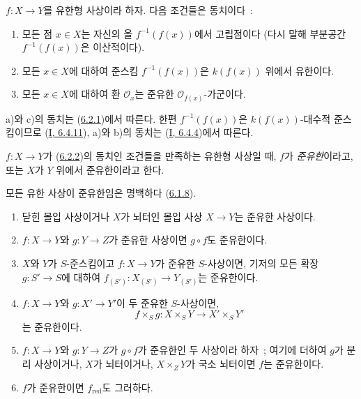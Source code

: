 \begin{corollary}[6.2.2]
\label{II.6.2.2-ko}
$f:X\to Y$를 유한형 사상이라 하자. 다음 조건들은 동치이다~:
\begin{enumerate}
\item[a)] 모든 점 $x\in X$는 자신의 올 $f^{-1}(f(x))$에서 고립점이다
(다시 말해 부분공간 $f^{-1}(f(x))$은 이산적이다).
\item[b)] 모든 $x\in X$에 대하여 준스킴 $f^{-1}(f(x))$은
$k(f(x))$ 위에서 유한이다.
\item[c)] 모든 $x\in X$에 대하여 환 $\mathcal{O}_x$는 준유한
$\mathcal{O}_{f(x)}$-가군이다.
\end{enumerate}
\end{corollary}

a)와 c)의 동치는 (\hyperref[II.6.2.1-ko]{6.2.1})에서 따른다. 한편
$f^{-1}(f(x))$은 $k(f(x))$-대수적 준스킴이므로
(\hyperref[I.6.4.11-ko]{I, 6.4.11}), a)와 b)의 동치는
(\hyperref[I.6.4.4-ko]{I, 6.4.4})에서 따른다.

\begin{definition}[6.2.3]
\label{II.6.2.3-ko}
$f:X\to Y$가 (\hyperref[II.6.2.2-ko]{6.2.2})의 동치인 조건들을
만족하는 유한형 사상일 때, $f$가 \emph{준유한}이라고, 또는 $X$가
$Y$ 위에서 준유한이라고 한다.
\end{definition}

모든 유한 사상이 준유한임은 명백하다
(\hyperref[II.6.1.8-ko]{6.1.8}).

\begin{proposition}[6.2.4]
\label{II.6.2.4-ko}
\begin{enumerate}
\item[(i)] 닫힌 몰입 사상이거나 $X$가 뇌터인 몰입 사상 $X\to Y$는
준유한 사상이다.
\item[(ii)] $f:X\to Y$와 $g:Y\to Z$가 준유한 사상이면
$g\circ f$도 준유한이다.
\item[(iii)] $X$와 $Y$가 $S$-준스킴이고 $f:X\to Y$가 준유한
$S$-사상이면, 기저의 모든 확장 $g:S'\to S$에 대하여
$f_{(S')}:X_{(S')}\to Y_{(S')}$는 준유한이다.
\item[(iv)] $f:X\to Y$와 $g:X'\to Y'$이 두 준유한 $S$-사상이면,
\[
f\times_S g:X\times_S Y\to X'\times_S Y'
\]
는 준유한이다.
\item[(v)] $f:X\to Y$와 $g:Y\to Z$가 $g\circ f$가 준유한인
두 사상이라 하자~; 여기에 더하여 $g$가 분리 사상이거나, $X$가
뇌터이거나, $X\times_ZY$가 국소 뇌터이면 $f$는 준유한이다.
\item[(vi)] $f$가 준유한이면 $f_{\mathrm{red}}$도 그러하다.
\end{enumerate}
\end{proposition}

